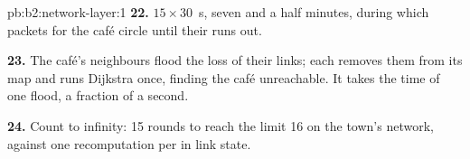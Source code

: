 \begin{solution}{pb:b2:network-layer:1}
\textbf{22.} $15 \times 30$~s, seven and a half minutes, during which packets for the café circle until their  runs out.

\textbf{23.} The café's neighbours flood the loss of their links; each  removes them from its map and runs
Dijkstra once, finding the café unreachable. It takes the time of one flood, a fraction of a second.

\textbf{24.} Count to infinity: 15 rounds to reach the limit 16 on the town's network, against one recomputation per
 in link state.
\end{solution}

